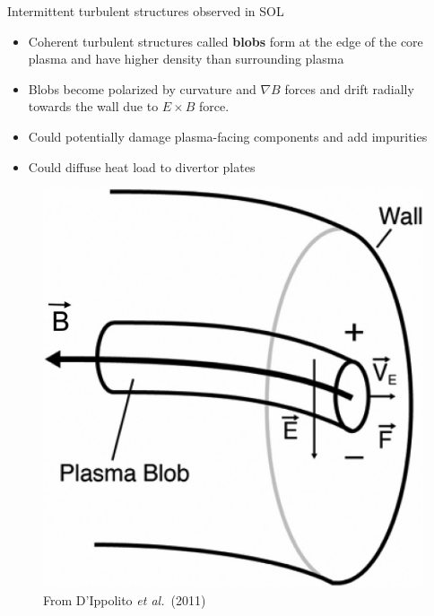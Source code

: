 \documentclass[12pt,table]{beamer}
\newcommand{\etal}{\emph{et al.}}
\begin{document}
\begin{frame}{Intermittent turbulent structures observed in SOL}
    \begin{minipage}{.65\linewidth}
    \begin{itemize} \footnotesize
        \item Coherent turbulent structures called \textbf{\textcolor{UT_orange}{blobs}} form at the edge of the core plasma and have higher density than surrounding plasma
        \item Blobs become polarized by curvature and $\nabla B$ forces and drift radially towards the wall due to $E \times B$ force.
        \item Could potentially damage plasma-facing components and add impurities {\large \textcolor{red}{\frownie{}}}
        \item Could diffuse heat load to divertor plates {\large\textcolor{green}{\smiley{}}}
    \end{itemize}%
    \end{minipage}
    \begin{minipage}{.3\linewidth}
    \begin{figure}
        \centering
        \includegraphics[width=.9\linewidth]{figs/plasma-blob.jpeg} \\
        \tiny From D'Ippolito \etal\ (2011)
    \end{figure}
    \end{minipage}%

\end{frame}
\end{document}
